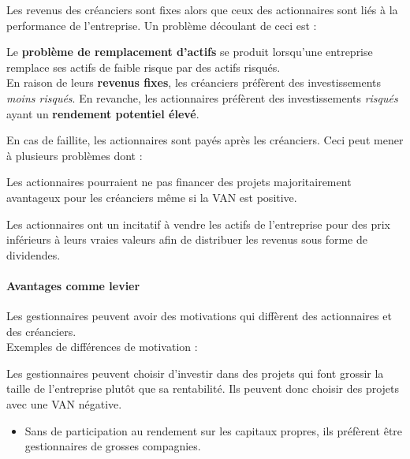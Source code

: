 \documentclass[10pt, french]{article}
\begin{document}
\begin{multicols*}{2}
Les revenus des créanciers sont fixes alors que ceux des actionnaires sont liés à la performance de l'entreprise. Un problème découlant de ceci est :

\begin{definitionNOHFILLprop}
Le \textbf{problème de remplacement d'actifs} se produit lorsqu'une entreprise remplace ses actifs de faible risque par des actifs risqués.	\\

En raison de leurs \textbf{revenus fixes}, les créanciers préfèrent des investissements \textit{moins risqués}. En revanche, les actionnaires préfèrent des investissements \textit{risqués} ayant un \textbf{rendement potentiel élevé}. 
\end{definitionNOHFILLprop}

En cas de faillite, les actionnaires sont payés après les créanciers. Ceci peut mener à plusieurs problèmes dont : 

\begin{definitionNOHFILLprop}
Les actionnaires pourraient ne pas financer des projets majoritairement avantageux pour les créanciers même si la VAN est positive. 
\end{definitionNOHFILLprop}

\begin{definitionNOHFILLprop}
Les actionnaires ont un incitatif à vendre les actifs de l'entreprise pour des prix inférieurs à leurs vraies valeurs afin de distribuer les revenus sous forme de dividendes.
\end{definitionNOHFILLprop}


\paragraph{Avantages comme levier}	
Les gestionnaires peuvent avoir des motivations qui diffèrent des actionnaires et des créanciers.	\\

Exemples de différences de motivation :
\begin{definitionNOHFILLprop}
Les gestionnaires peuvent choisir d'investir dans des projets qui font grossir la taille de l'entreprise plutôt que sa rentabilité.  Ils peuvent donc choisir des projets avec une VAN négative.	\\

\begin{itemize}
	\item	Sans de participation au rendement sur les capitaux propres, ils préfèrent être gestionnaires de grosses compagnies.
\end{itemize}
\end{definitionNOHFILLprop}


\end{multicols*}
\end{document}
